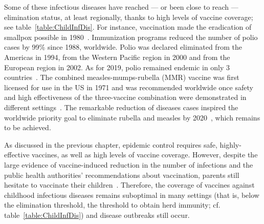 Some of these infectious diseases have reached --- or been close to reach --- elimination status, at least regionally, thanks to high levels of vaccine coverage; see table~\ref{table:ChildInfDis}. For instance, vaccination made the eradication of smallpox possible in 1980~\cite[]{WHO_SmallpoxEradication1980,CDC_Smallpox2001}. Immunization programs reduced the number of polio cases by 99\% since 1988, worldwide. Polio was declared eliminated from the Americas in 1994, from the Western Pacific region in 2000 and from the European region in 2002. As for 2019, polio remained endemic in only 3 countries~\cite[]{WHO_Factsheet_Polio}. The combined measles-mumps-rubella (MMR) vaccine was first licensed for use in the US in 1971 and was recommended worldwide once safety and high effectiveness of the three-vaccine combination were demonstrated in different settings~\cite[]{Strebel2013}. The remarkable reduction of diseases cases inspired the worldwide priority goal to eliminate rubella and measles by 2020~\cite[]{Andrus2011,WHO_MRPlan2012}, which remains to be achieved.

As discussed in the previous chapter, epidemic control requires safe, highly-effective vaccines, as well as high levels of vaccine coverage. However, despite the large evidence of vaccine-induced reduction in the number of infections and the public health authorities' recommendations about vaccination, parents still hesitate to vaccinate their children~\cite[]{Larson2016}. Therefore, the coverage of vaccines against childhood infectious diseases remains suboptimal in many settings (that is, below the elimination threshold, the threshold to obtain herd immunity; cf. table~\ref{table:ChildInfDis}) and disease outbreaks still occur.

